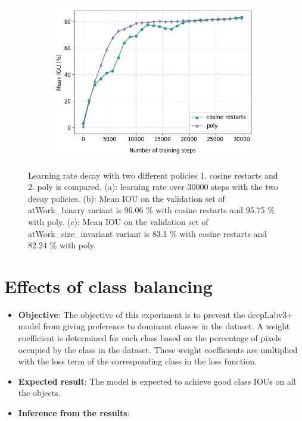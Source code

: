 \begin{figure}
\begin{subfigure}{.3\textwidth}
			\includegraphics[width=1\linewidth]{images/lr_size}
			\caption{}
		\end{subfigure}
		\caption{Learning rate decay with two different policies 1. cosine restarts and 2. poly is compared. (a): learning rate over 30000 steps with the two decay policies. (b): Mean IOU on the validation set of atWork\_binary variant is 96.06 \% with cosine restarts and 95.75 \% with poly. (c): Mean IOU on the validation set of atWork\_size\_invariant variant is 83.1 \% with cosine restarts and 82.24 \% with poly.}
		\label{Fig:lr}
	\end{figure}

\section{Effects of class balancing}

	\begin{itemize}
		\item \textbf{Objective}: The objective of this experiment is to prevent the deepLabv3+ model from giving preference to dominant classes in the dataset. A weight coefficient is determined for each class based on the percentage of pixels occupied by the class in the dataset. These weight coefficients are multiplied with the loss term of the corresponding class in the loss function.
		\item \textbf{Expected result}: The model is expected to achieve good class IOUs on all the objects.
		\item \textbf{Inference from the results}: 
	\end{itemize}

